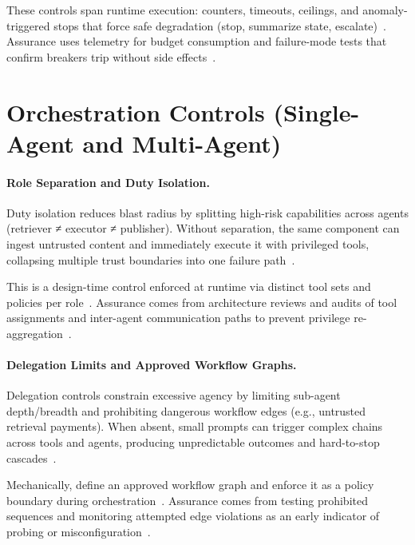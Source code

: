 \begin{TNtwocol}
  These controls span runtime execution: counters, timeouts, ceilings, and anomaly-triggered stops that force safe degradation (stop, summarize state, escalate)~\cite{owasp-top10-llm-2025,cisa-ztmm-v2}. Assurance uses telemetry for budget consumption and failure-mode tests that confirm breakers trip without side effects~\cite{owasp-top10-llm-2025,cisa-ztmm-v2}.

  \section{Orchestration Controls (Single-Agent and Multi-Agent)}

  \paragraph{Role Separation and Duty Isolation.}
  Duty isolation reduces blast radius by splitting high-risk capabilities across agents (retriever ≠ executor ≠ publisher). Without separation, the same component can ingest untrusted content and immediately execute it with privileged tools, collapsing multiple trust boundaries into one failure path~\cite{nist-airmf-100-1,nist-sp800-53b}.

  This is a design-time control enforced at runtime via distinct tool sets and policies per role~\cite{nist-airmf-100-1,nist-sp800-53b}. Assurance comes from architecture reviews and audits of tool assignments and inter-agent communication paths to prevent privilege re-aggregation~\cite{nist-airmf-100-1,nist-sp800-53b}.

  \paragraph{Delegation Limits and Approved Workflow Graphs.}
  Delegation controls constrain excessive agency by limiting sub-agent depth/breadth and prohibiting dangerous workflow edges (e.g., untrusted retrieval  \rightarrow  payments). When absent, small prompts can trigger complex chains across tools and agents, producing unpredictable outcomes and hard-to-stop cascades~\cite{owasp-top10-llm-2025,cisa-ztmm-v2}.

  Mechanically, define an approved workflow graph and enforce it as a policy boundary during orchestration~\cite{owasp-top10-llm-2025,cisa-ztmm-v2}. Assurance comes from testing prohibited sequences and monitoring attempted edge violations as an early indicator of probing or misconfiguration~\cite{owasp-top10-llm-2025,cisa-ztmm-v2}.


\end{TNtwocol}
